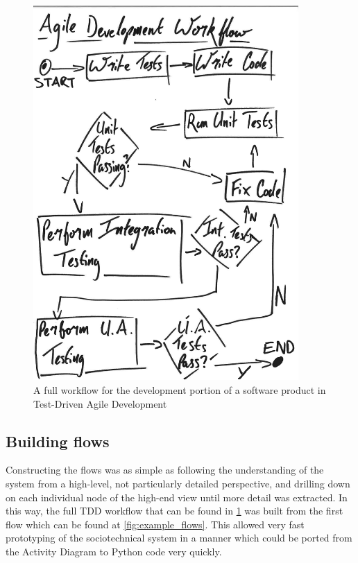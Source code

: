 \begin{figure}[p]
    \centering
    \includegraphics[width=0.9\textwidth]{images/drawn_agile_workflow.pdf}
    \caption{A full workflow for the development portion of a software product in Test-Driven Agile Development}
    \label{fig:agile_workflow}
\end{figure}

\subsection{Building flows}
Constructing the flows was as simple as following the understanding of the system from a high-level, not particularly detailed perspective, and drilling down on each individual node of the high-end view until more detail was extracted. In this way, the full TDD workflow that can be found in \cref{fig:agile_workflow} was built from the first flow which can be found at \cref{fig:example_flows}. This allowed very fast prototyping of the sociotechnical system in a manner which could be ported from the Activity Diagram to Python code very quickly. \par

